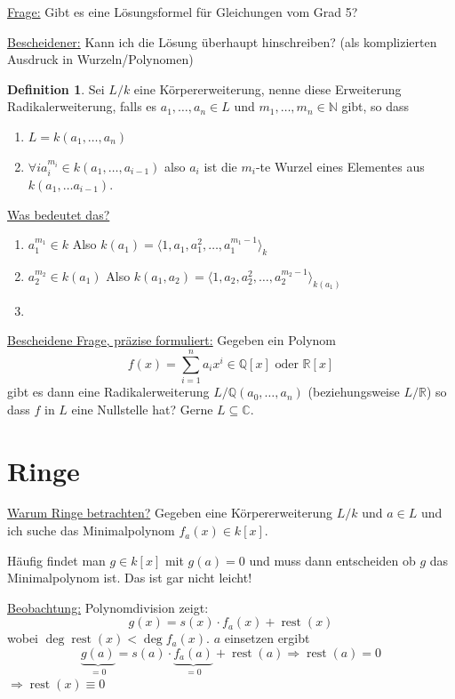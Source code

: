 \documentclass[12pt,parskip=full]{scrartcl}
\newcommand{\setN}{\mathbb{N}}
\newcommand{\setQ}{\mathbb{Q}}
\newcommand{\setR}{\mathbb{R}}
\newcommand{\setC}{\mathbb{C}}
\newcommand{\heading}{\underline}
\theoremstyle{definition}
\newtheorem{definition}[theorem]{Definition}
\theoremstyle{remark}
\begin{document}
	\heading{Frage:} Gibt es eine Lösungsformel für Gleichungen vom Grad 5?
	
	\heading{Bescheidener:} Kann ich die Lösung überhaupt hinschreiben? (als komplizierten Ausdruck in Wurzeln/Polynomen)
	
	\begin{definition}
		Sei $L/k$ eine Körpererweiterung, nenne diese Erweiterung Radikalerweiterung, falls es $a_1, \dots, a_n \in L$ und $m_1, \dots, m_n \in \setN$ gibt, so dass
		\begin{enumerate}
			\item $L = k(a_1, \dots, a_n)$
			\item $\forall i a_i^{m_i} \in k(a_1, \dots, a_{i-1})$ also $a_i$ ist die $m_i$-te Wurzel eines Elementes aus $k(a_1, \dots a_{i-1})$.
		\end{enumerate}
	\end{definition}

	\heading{Was bedeutet das?}
	\begin{enumerate}
		\item $a_1^{m_1} \in k$ Also $k(a_1) = \langle 1 , a_1, a_1^2, \dots, a_1^{m_1 - 1} \rangle_k$
		\item $a_2^{m_2} \in k(a_1)$ Also $k(a_1, a_2) = \langle 1 , a_2, a_2^2, \dots, a_2^{m_2 - 1} \rangle_{k(a_1)}$
		\item \textellipsis
	\end{enumerate}

	\heading{Bescheidene Frage, präzise formuliert:} Gegeben ein Polynom
	\begin{equation*}
		f(x) = \sum_{i=1}^{n} a_i x^i \in \setQ[x] \text{ oder } \setR[x]
	\end{equation*}
	gibt es dann eine Radikalerweiterung $L/\setQ(a_0, \dots, a_n)$ (beziehungsweise $L/\setR$) so dass $f$ in $L$ eine Nullstelle hat? Gerne $L \subseteq \setC$.
	
	\section{Ringe}
	
	\heading{Warum Ringe betrachten?} Gegeben eine Körpererweiterung $L/k$ und $a \in L$ und ich suche das Minimalpolynom $f_a(x) \in k[x]$.
	
	Häufig findet man $g \in k[x]$ mit $g(a) = 0$ und muss dann entscheiden ob $g$ das Minimalpolynom ist. Das ist gar nicht leicht!
	
	\heading{Beobachtung:} Polynomdivision zeigt:
	\begin{equation*}
		g(x) = s(x) \cdot f_a(x) + \operatorname{rest}(x)
	\end{equation*}
	wobei $\deg \operatorname{rest}(x) < \deg f_a(x)$. $a$ einsetzen ergibt
	\begin{equation*}
		\underbrace{g(a)}_{= 0} = s(a) \cdot \underbrace{f_a(a)}_{=0} + \operatorname{rest}(a) \Rightarrow \operatorname{rest}(a) = 0
 	\end{equation*}
 	$\Rightarrow \operatorname{rest}(x) \equiv 0$
 	
\end{document}
